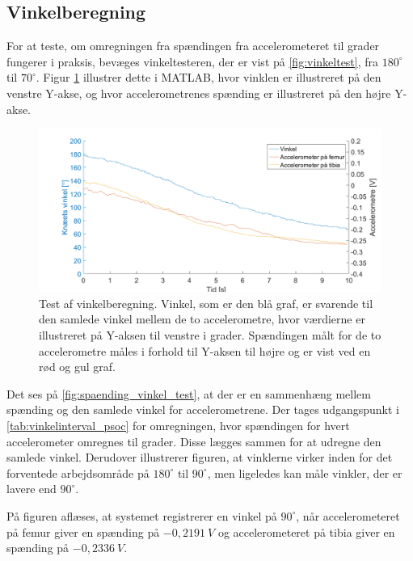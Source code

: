 \subsection{Vinkelberegning}

For at teste, om omregningen fra spændingen fra accelerometeret til grader fungerer i praksis, bevæges vinkeltesteren, der er vist på \autoref{fig:vinkeltest}, fra $180^{\circ}$ til $70^{\circ}$. Figur \ref{fig:spaending_vinkel_test} illustrer dette i MATLAB, hvor vinklen er illustreret på den venstre Y-akse, og hvor accelerometrenes spænding er illustreret på den højre Y-akse.

\begin{figure}[H]
\centering
\includegraphics[width=1\textwidth]{figures/spaending_vinkel_test}
\caption{Test af vinkelberegning. Vinkel, som er den blå graf, er svarende til den samlede vinkel mellem de to accelerometre, hvor værdierne er illustreret på Y-aksen til venstre i grader. Spændingen målt for de to accelerometre måles i forhold til Y-aksen til højre og er vist ved en rød og gul graf.}
\label{fig:spaending_vinkel_test}
\end{figure}

\noindent
Det ses på \autoref{fig:spaending_vinkel_test}, at der er en sammenhæng mellem spænding og den samlede vinkel for accelerometrene. Der tages udgangspunkt i \autoref{tab:vinkelinterval_psoc} for omregningen, hvor spændingen for hvert accelerometer omregnes til grader. Disse lægges sammen for at udregne den samlede vinkel. Derudover illustrerer figuren, at vinklerne virker inden for det forventede arbejdsområde på $180^{\circ}$ til $90^{\circ}$, men ligeledes kan måle vinkler, der er lavere end $90^{\circ}$.

På figuren aflæses, at systemet registrerer en vinkel på $90^{\circ}$, når  accelerometeret på femur giver en spænding på $-0,2191~V$ og accelerometeret på tibia giver en spænding på $-0,2336~V$. 

